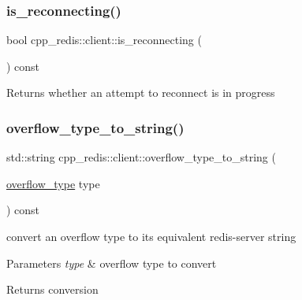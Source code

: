 \subsubsection{\texorpdfstring{is\+\_\+reconnecting()}{is\_reconnecting()}}
{\footnotesize\ttfamily bool cpp\+\_\+redis\+::client\+::is\+\_\+reconnecting (\begin{DoxyParamCaption}{ }\end{DoxyParamCaption}) const}

\begin{DoxyReturn}{Returns}
whether an attempt to reconnect is in progress 
\end{DoxyReturn}
\mbox{\label{classcpp__redis_1_1client_a696a7fa2b06245323eca8c232d307585}} 
\subsubsection{\texorpdfstring{overflow\+\_\+type\+\_\+to\+\_\+string()}{overflow\_type\_to\_string()}}
{\footnotesize\ttfamily std\+::string cpp\+\_\+redis\+::client\+::overflow\+\_\+type\+\_\+to\+\_\+string (\begin{DoxyParamCaption}\item[{\mbox{\hyperlink{classcpp__redis_1_1client_a4119182ad3a01c1bb626a174375e114a}{overflow\+\_\+type}}}]{type }\end{DoxyParamCaption}) const}

convert an overflow type to its equivalent redis-\/server string


\begin{DoxyParams}{Parameters}
{\em type} & overflow type to convert \\
\hline
\end{DoxyParams}
\begin{DoxyReturn}{Returns}
conversion 
\end{DoxyReturn}
\mbox{\label{classcpp__redis_1_1client_a490ef812b666e6d845fcacc808b87bc1}} 
